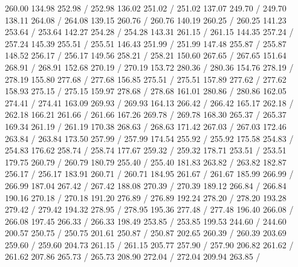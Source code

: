 { 260.00 134.98 252.98 /
 252.98 136.02 251.02 /
 251.02 137.07 249.70 /
 249.70 138.11 264.08 /
 264.08 139.15 260.76 /
 260.76 140.19 260.25 /
 260.25 141.23 253.64 /
 253.64 142.27 254.28 /
 254.28 143.31 261.15 /
 261.15 144.35 257.24 /
 257.24 145.39 255.51 /
 255.51 146.43 251.99 /
 251.99 147.48 255.87 /
 255.87 148.52 256.17 /
 256.17 149.56 258.21 /
 258.21 150.60 267.65 /
 267.65 151.64 268.91 /
 268.91 152.68 270.19 /
 270.19 153.72 280.36 /
 280.36 154.76 278.19 /
 278.19 155.80 277.68 /
 277.68 156.85 275.51 /
 275.51 157.89 277.62 /
 277.62 158.93 275.15 /
 275.15 159.97 278.68 /
 278.68 161.01 280.86 /
 280.86 162.05 274.41 /
 274.41 163.09 269.93 /
 269.93 164.13 266.42 /
 266.42 165.17 262.18 /
 262.18 166.21 261.66 /
 261.66 167.26 269.78 /
 269.78 168.30 265.37 /
 265.37 169.34 261.19 /
 261.19 170.38 268.63 /
 268.63 171.42 267.03 /
 267.03 172.46 263.84 /
 263.84 173.50 257.99 /
 257.99 174.54 255.92 /
 255.92 175.58 254.83 /
 254.83 176.62 258.74 /
 258.74 177.67 259.32 /
 259.32 178.71 253.51 /
 253.51 179.75 260.79 /
 260.79 180.79 255.40 /
 255.40 181.83 263.82 /
 263.82 182.87 256.17 /
 256.17 183.91 260.71 /
 260.71 184.95 261.67 /
 261.67 185.99 266.99 /
 266.99 187.04 267.42 /
 267.42 188.08 270.39 /
 270.39 189.12 266.84 /
 266.84 190.16 270.18 /
 270.18 191.20 276.89 /
 276.89 192.24 278.20 /
 278.20 193.28 279.42 /
 279.42 194.32 278.95 /
 278.95 195.36 277.48 /
 277.48 196.40 266.08 /
 266.08 197.45 266.33 /
 266.33 198.49 253.85 /
 253.85 199.53 244.60 /
 244.60 200.57 250.75 /
 250.75 201.61 250.87 /
 250.87 202.65 260.39 /
 260.39 203.69 259.60 /
 259.60 204.73 261.15 /
 261.15 205.77 257.90 /
 257.90 206.82 261.62 /
 261.62 207.86 265.73 /
 265.73 208.90 272.04 /
 272.04 209.94 263.85 /
}

